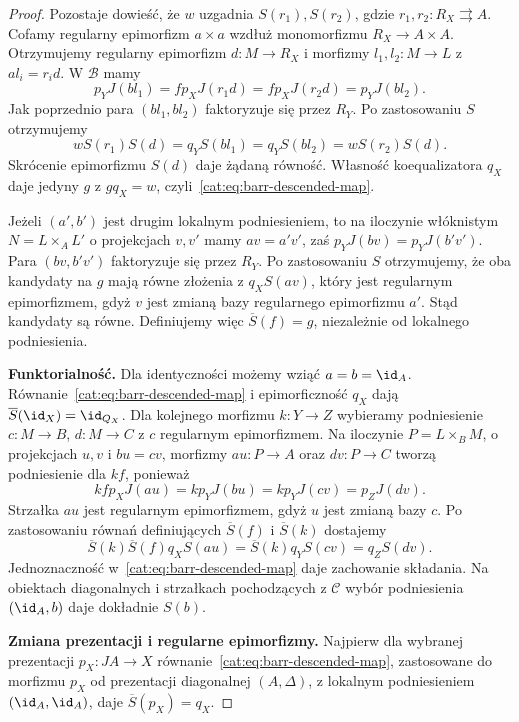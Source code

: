 \begin{proof}
Pozostaje dowieść, że $w$ uzgadnia $S(r_1),S(r_2)$, gdzie $r_1,r_2:R_X\rightrightarrows A$. Cofamy regularny epimorfizm $a\times a$ wzdłuż monomorfizmu $R_X\to A\times A$. Otrzymujemy regularny epimorfizm $d:M\to R_X$ i morfizmy $l_1,l_2:M\to L$ z $al_i=r_i d$. W $\mathcal B$ mamy
\[
 p_Y J(bl_1)= f p_X J(r_1d)
 = f p_X J(r_2d)=p_Y J(bl_2).
\]
Jak poprzednio para $(bl_1,bl_2)$ faktoryzuje się przez $R_Y$. Po zastosowaniu $S$ otrzymujemy
\[
 wS(r_1)S(d)=q_YS(bl_1)=q_YS(bl_2)=wS(r_2)S(d).
\]
Skrócenie epimorfizmu $S(d)$ daje żądaną równość. Własność koequalizatora $q_X$ daje jedyny $g$ z $gq_X=w$, czyli~\eqref{cat:eq:barr-descended-map}.

Jeżeli $(a',b')$ jest drugim lokalnym podniesieniem, to na iloczynie włóknistym $N=L\times_A L'$ o projekcjach $v,v'$ mamy $av=a'v'$, zaś $p_YJ(bv)=p_YJ(b'v')$. Para $(bv,b'v')$ faktoryzuje się przez $R_Y$. Po zastosowaniu $S$ otrzymujemy, że oba kandydaty na $g$ mają równe złożenia z $q_XS(av)$, który jest regularnym epimorfizmem, gdyż $v$ jest zmianą bazy regularnego epimorfizmu $a'$. Stąd kandydaty są równe. Definiujemy więc $\overline S(f)=g$, niezależnie od lokalnego podniesienia.

\textbf{Funktorialność.}
Dla identyczności możemy wziąć $a=b=\id_A$. Równanie~\eqref{cat:eq:barr-descended-map} i epimorficzność $q_X$ dają $\overline S(\id_X)=\id_{Q_X}$. Dla kolejnego morfizmu $k:Y\to Z$ wybieramy podniesienie $c:M\to B$, $d:M\to C$ z $c$ regularnym epimorfizmem. Na iloczynie $P=L\times_B M$, o projekcjach $u,v$ i $bu=cv$, morfizmy $au:P\to A$ oraz $dv:P\to C$ tworzą podniesienie dla $kf$, ponieważ
\[
 kf p_X J(au)=k p_Y J(bu)=k p_Y J(cv)=p_Z J(dv).
\]
Strzałka $au$ jest regularnym epimorfizmem, gdyż $u$ jest zmianą bazy $c$. Po zastosowaniu równań definiujących $\overline S(f)$ i $\overline S(k)$ dostajemy
\[
 \overline S(k)\overline S(f)q_X S(au)
 =\overline S(k)q_Y S(cv)=q_Z S(dv).
\]
Jednoznaczność w~\eqref{cat:eq:barr-descended-map} daje zachowanie składania. Na obiektach diagonalnych i strzałkach pochodzących z $\mathcal C$ wybór podniesienia $(\id_A,b)$ daje dokładnie $S(b)$.

\textbf{Zmiana prezentacji i regularne epimorfizmy.}
Najpierw dla wybranej prezentacji $p_X:JA\to X$ równanie~\eqref{cat:eq:barr-descended-map}, zastosowane do morfizmu $p_X$ od prezentacji diagonalnej $(A,\Delta)$, z lokalnym podniesieniem $(\id_A,\id_A)$, daje $\overline S(p_X)=q_X$.


\end{proof}
